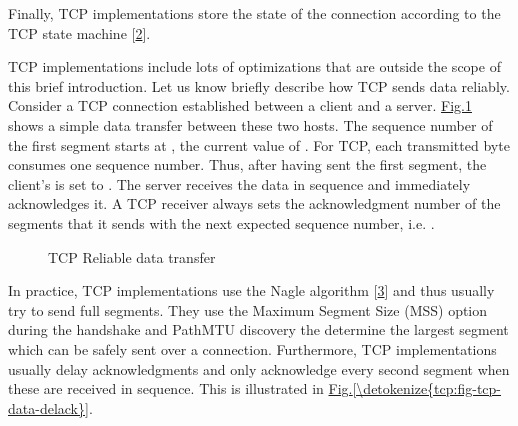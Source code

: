 \documentclass[letterpaper,10pt,english]{sphinxmanual}
\begin{document}
\sphinxAtStartPar
Finally, TCP implementations store the state of the connection according to the TCP state machine {[}\hyperlink{cite.biblio:id729}{2}{]}.

\sphinxAtStartPar
TCP implementations include lots of optimizations that are outside the scope of this brief introduction. Let us know briefly describe how TCP sends data reliably. Consider a TCP connection established between a client and a server. \hyperref[\detokenize{tcp:fig-tcp-simple-data}]{Fig.\@ \ref{\detokenize{tcp:fig-tcp-simple-data}}} shows a simple data transfer between these two hosts. The sequence number of the first segment starts at , the current value of . For TCP, each transmitted byte consumes one sequence number. Thus, after having sent the first segment, the client’s  is set to .  The server receives the data in sequence and immediately acknowledges it. A TCP receiver always sets the acknowledgment number of the segments that it sends with the next expected sequence number, i.e. .
\begin{figure}[htbp]\centering\capstart{}\caption{TCP Reliable data transfer}\label{\detokenize{tcp:id7}}\label{\detokenize{tcp:fig-tcp-simple-data}}\end{figure}
\sphinxAtStartPar
In practice, TCP implementations use the Nagle algorithm {[}\hyperlink{cite.biblio:id831}{3}{]} and thus usually try to send full segments. They use the Maximum Segment Size (MSS) option during the handshake and PathMTU discovery the determine the largest segment which can be safely sent over a connection. Furthermore, TCP implementations usually delay acknowledgments and only acknowledge every second segment when these are received in sequence. This is illustrated in \hyperref[\detokenize{tcp:fig-tcp-data-delack}]{Fig.\@ \ref{\detokenize{tcp:fig-tcp-data-delack}}}.
\end{document}
